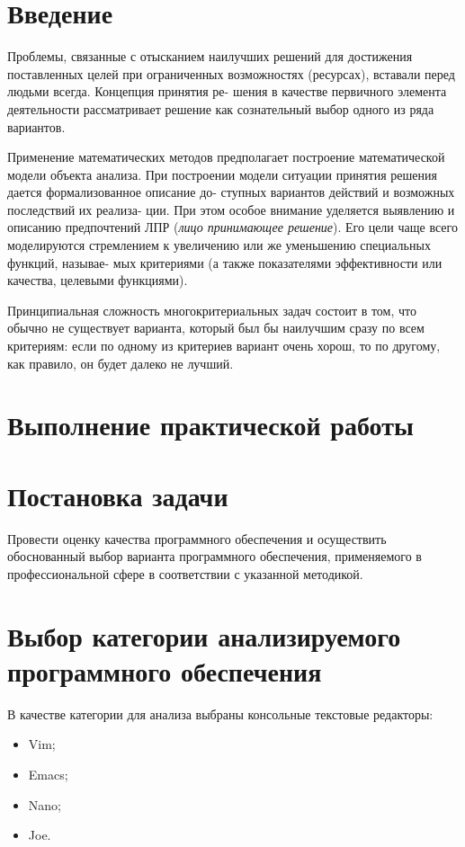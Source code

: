 \graphicspath{{~/Pictures/Screenshots/}} %

\section*{\LARGE Введение}
Проблемы, связанные с отысканием наилучших решений для
достижения поставленных целей при ограниченных возможностях
(ресурсах), вставали перед людьми всегда. Концепция принятия ре-
шения в качестве первичного элемента деятельности рассматривает
решение как сознательный выбор одного из ряда вариантов.\par
Применение математических методов предполагает построение
математической модели объекта анализа. При построении модели
ситуации принятия решения дается формализованное описание до-
ступных вариантов действий и возможных последствий их реализа-
ции. При этом особое внимание уделяется выявлению и описанию
предпочтений ЛПР (\textit{лицо принимающее решение}).
Его цели чаще всего моделируются стремлением
к увеличению или же уменьшению специальных функций, называе-
мых критериями (а также показателями эффективности или качества,
целевыми функциями).\par
Принципиальная сложность многокритериальных задач состоит в
том, что обычно не существует варианта, который был бы наилучшим
сразу по всем критериям: если по одному из критериев вариант очень
хорош, то по другому, как правило, он будет далеко не лучший.

\clearpage

\section*{\LARGE Выполнение практической работы}

\section{Постановка задачи}
Провести оценку качества программного обеспечения и осуществить
обоснованный выбор варианта программного обеспечения, применяемого в
профессиональной сфере в соответствии с указанной методикой.

\section[Выбор категорий]{Выбор категории анализируемого программного
	обеспечения}
В качестве категории для анализа выбраны консольные текстовые редакторы:
\begin{itemize}
	\item Vim;
	\item Emacs;
	\item Nano;
	\item Joe.
\end{itemize}

